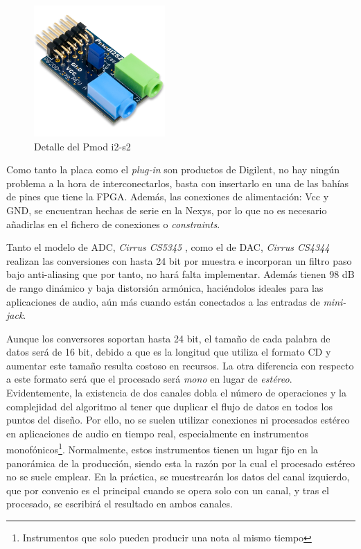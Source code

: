 \begin{figure}[!ht]
\begin{center}
\includegraphics[width=5cm]{img/pmod.png}
\caption{\label{fig:pmod}Detalle del Pmod i2-s2}
\end{center}
\end{figure}

Como tanto la placa como el \emph{plug-in} son productos de Digilent, no hay ningún problema a la hora de interconectarlos, basta con insertarlo en una de las bahías de pines que tiene la FPGA. Además, las conexiones de alimentación: Vcc y GND, se encuentran hechas de serie en la Nexys, por lo que no es necesario añadirlas en el fichero de conexiones o \emph{constraints}.

Tanto el modelo de ADC, \emph{Cirrus CS5345} \cite{adcdata}, como el de DAC, \emph{Cirrus CS4344} \cite{dacdata} realizan las conversiones con hasta 24 bit por muestra e incorporan un filtro paso bajo anti-aliasing que por tanto, no hará falta implementar. Además tienen 98 dB de rango dinámico y baja distorsión armónica, haciéndolos ideales para las aplicaciones de audio, aún más cuando están conectados a  las entradas de \emph{mini-jack}.

Aunque los conversores soportan hasta 24 bit, el tamaño de cada palabra de datos será de 16 bit, debido a que es la longitud que utiliza el formato CD y aumentar este tamaño resulta costoso en recursos. La otra diferencia con respecto a este formato será que el procesado será \emph{mono} en lugar de \emph{estéreo}. Evidentemente, la existencia de dos canales dobla el número de operaciones y la complejidad del algoritmo al tener que duplicar el flujo de datos en todos los puntos del diseño. Por ello, no se suelen utilizar conexiones ni procesados estéreo en aplicaciones de audio en tiempo real, especialmente en instrumentos monofónicos\footnote{Instrumentos que solo pueden producir una nota al mismo tiempo}. Normalmente, estos instrumentos tienen un lugar fijo en la panorámica de la producción, siendo esta la razón por la cual el procesado estéreo no se suele emplear. En la práctica, se muestrearán los datos del canal izquierdo, que por convenio es el principal cuando se opera solo con un canal, y tras el procesado, se escribirá el resultado en ambos canales.

